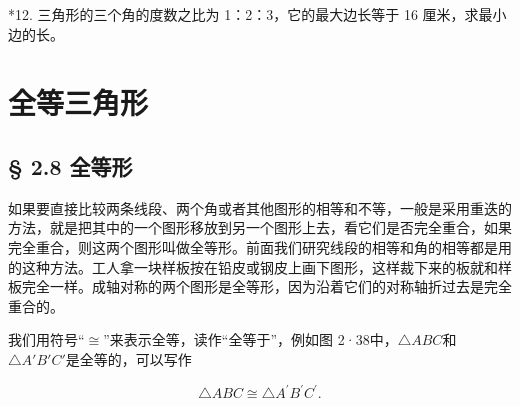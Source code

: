 *12. 三角形的三个角的度数之比为 1：2：3，它的最大边长等于 16
厘米，求最小边的长。

\section{全等三角形}

\subsection{§ 2.8 全等形}

如果要直接比较两条线段、两个角或者其他图形的相等和不等，一般是采用重迭的方法，就是把其中的一个图形移放到另一个图形上去，看它们是否完全重合，如果完全重合，则这两个图形叫做全等形。前面我们研究线段的相等和角的相等都是用的这种方法。工人拿一块样板按在铅皮或钢皮上画下图形，这样裁下来的板就和样板完全一样。成轴对称的两个图形是全等形，因为沿着它们的对称轴折过去是完全重合的。

我们用符号``\(\cong\)''来表示全等，读作``全等于''，例如图
2·38中，\(\triangle ABC\)和\(\triangle A'B'C'\)是全等的，可以写作

\[
\triangle ABC \cong \triangle A ^{\prime} B ^{\prime} C ^{\prime}.
\]

